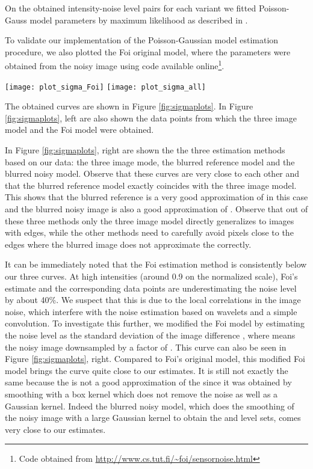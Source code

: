 \documentclass[review]{elsarticle}
\begin{document}
On the obtained  intensity-noise level pairs for each variant we fitted Poisson-Gauss model parameters  by maximum likelihood as described in  \cite{Foi-Poisson}.

To validate our implementation of the Poisson-Gaussian model estimation procedure, we also plotted the Foi original model, where the parameters were obtained from the noisy image using code available online\footnote{Code obtained from \url{http://www.cs.tut.fi/~foi/sensornoise.html}}.
\begin{figure*}[t]
\centering
\texttt{[image: plot\_sigma\_Foi]}
\texttt{[image: plot\_sigma\_all]}
\vskip -5mm
\caption{Left: The noise curve of our pair image model and the Foi Poisson-Gaussian Mixture model. Right: The noise curves for various noise estimation models using image pairs and the Foi Poisson-Gaussian Mixture model.}\label{fig:sigmaplots}
\vspace{-3mm}
\end{figure*}


The obtained curves are shown in Figure \ref{fig:sigmaplots}. In Figure \ref{fig:sigmaplots}, left are also shown the data points  from which the three image model and the Foi model were obtained.


 In Figure \ref{fig:sigmaplots}, right are shown the the three estimation methods based on our data: the three image mode, the blurred reference model and the blurred noisy model. Observe that these curves are very close to each other and that the blurred reference model exactly coincides with the three image model. This shows that the blurred reference is a very good approximation of  in this case and the blurred noisy image is also a good approximation of . Observe that out of these three methods only the three image model directly generalizes to images with edges, while the other methods need to carefully avoid pixels close to the edges where the blurred image does not approximate the  correctly.
 
 It can be immediately noted that the Foi estimation method is consistently below our three curves. At high intensities (around 0.9 on the normalized scale), Foi's estimate and the corresponding data points are underestimating the noise level by about 40\%.  
We suspect that this is due to the local correlations in the image noise, which interfere with the noise estimation based on wavelets and a simple convolution. To investigate this further, we modified the Foi model by estimating the noise level  as the standard deviation of the image difference ,  where  means the noisy image downsampled by a factor of . This curve can also be seen in Figure \ref{fig:sigmaplots}, right. Compared to Foi's original model, this modified Foi model brings the curve quite close to our estimates. It is still not exactly the same because the  is not a good approximation of the  since it was obtained by smoothing with a box kernel which does not remove the noise as well as a Gaussian kernel. Indeed the blurred noisy model, which does the smoothing of the noisy image with a large Gaussian kernel to obtain the  and level sets, comes very close to our estimates.
  
\end{document}
